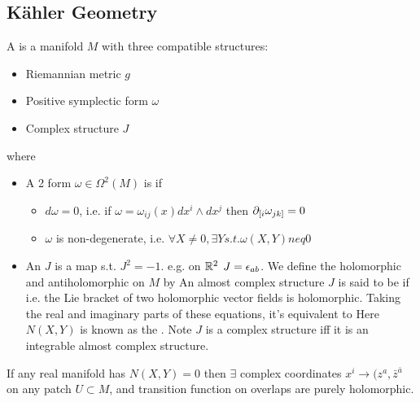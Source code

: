 \documentclass{article}
\begin{document}
\subsection{K\"ahler Geometry}
A  is a manifold $M$ with three compatible structures:
\begin{itemize}
    \item Riemannian metric $g$
    \item Positive symplectic form $\omega$
    \item Complex structure $J$
\end{itemize}
where 
\begin{itemize}
    \item A 2 form $\omega\in\Omega^2(M)$ is  if 
    \begin{itemize}
        \item $d\omega = 0$, i.e. if $\omega = \omega_{ij}(x) dx^i \wedge dx^j$ then $\partial_{[i}\omega_{jk]}=0$
        \item $\omega$ is non-degenerate, i.e. $\forall X \neq 0, \exists Y s.t. \omega(X,Y) neq 0$
    \end{itemize}
    \item An  $J$ is a map 
    s.t. $J^2 = -1$. e.g. on $\mathbb{R}^2$ $J = \epsilon_{ab}$. We define the holomorphic and antiholomorphic  on $M$ by 
    An almost complex structure $J$ is said to be  if 
    i.e. the Lie bracket of two holomorphic vector fields is holomorphic. Taking the real and imaginary parts of these equations, it's equivalent to 
    Here $N(X,Y)$ is known as the . Note 
    $J$ is a complex structure iff it is an integrable almost complex structure. 
\end{itemize}

\begin{theorem}
If any real manifold has $N(X,Y) = 0$ then $\exists$ complex coordinates $x^i \to (z^a,\bar{z}^{\bar{a}}$ on any patch $U\subset M$, and transition function on overlaps are purely holomorphic. 
\end{theorem}
\end{document}

